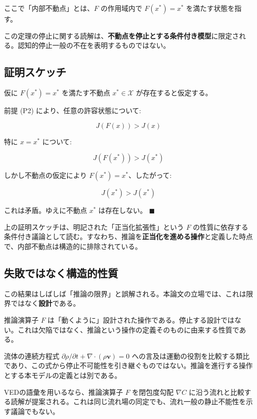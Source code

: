 ここで「内部不動点」とは、$F$ の作用域内で $F(x^*) = x^*$ を満たす状態を指す。

この定理の停止に関する読解は、\textbf{不動点を停止とする条件付き模型}に限定される。認知的停止一般の不在を表明するものではない。

\bigskip


\subsection{証明スケッチ}


仮に $F(x^*) = x^*$ を満たす不動点 $x^* \in \mathcal{X}$ が存在すると仮定する。

前提 (P2) により、任意の許容状態について:

\[
J(F(x)) > J(x)
\]

特に $x = x^*$ について:

\[
J(F(x^*)) > J(x^*)
\]

しかし不動点の仮定により $F(x^*) = x^*$、したがって:

\[
J(x^*) > J(x^*)
\]

これは矛盾。ゆえに不動点 $x^*$ は存在しない。 $\blacksquare$

上の証明スケッチは、明記された「正当化拡張性」という $F$ の性質に依存する条件付き議論として読む。すなわち、推論を\textbf{正当化を進める操作}と定義した時点で、内部不動点は構造的に排除されている。

\bigskip


\subsection{失敗ではなく構造的性質}


この結果はしばしば「推論の限界」と誤解される。本論文の立場では、これは限界ではなく\textbf{設計}である。

推論演算子 $F$ は「動くように」設計された操作である。停止する設計ではない。これは欠陥ではなく、推論という操作の定義そのものに由来する性質である。

流体の連続方程式 $\partial \rho / \partial t + \nabla \cdot (\rho \mathbf{v}) = 0$ への言及は運動の役割を比較する類比であり、この式から停止不可能性を引き継ぐものではない。推論を進行する操作とする本モデルの定義とは別である。

VEDの語彙を用いるなら、推論演算子 $F$ を閉包度勾配 $\nabla C$ に沿う流れと比較する読解が提案される。これは同じ流れ場の同定でも、流れ一般の静止不能性を示す議論でもない。

\bigskip


